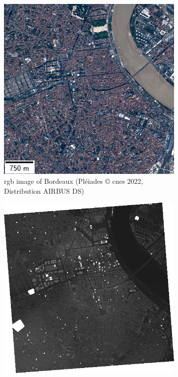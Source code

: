 \begin{figure}
    \centering
    \begin{subfigure}[t]{0.48\linewidth}
        \flushleft
        \includegraphics[width=\linewidth]{Images/Chap_6/miniature_Bordeaux.png}
        \caption{\acrshort{rgb} image of Bordeaux (Pléiades © \acrshort{cnes} 2022, Distribution AIRBUS DS)}
        \label{fig:miniature_Bordeaux_rgb}
    \end{subfigure}\hfill
    \begin{subfigure}[t]{0.48\linewidth}
        \flushright
        \includegraphics[width=\linewidth]{Images/Chap_6/miniature_Bordeaux_gt.png}

\end{subfigure}
\end{figure}
